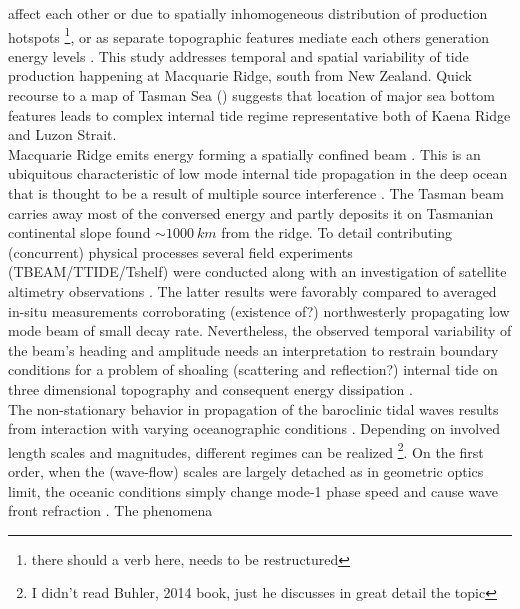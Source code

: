 \documentclass[12pt]{article}
\begin{document}
affect each other \citep{nash2004internal, zilberman2011incoherent, echeverri2010internal} or due 
to spatially inhomogeneous distribution of production hotspots \citep{osborne2011spatial, 
ponte2013coastal}\footnote{there should a verb here, needs to be restructured}, or as separate 
topographic features mediate each others generation energy levels \citep{xing1998three, 
buijsman2012modeling, buijsman2014three}. This study addresses temporal and spatial variability of 
tide production happening at Macquarie Ridge, south from New Zealand. Quick recourse to a map of 
Tasman Sea () suggests that location of major sea bottom features leads to 
complex internal tide regime representative both of Kaena Ridge and Luzon Strait.\\
Macquarie Ridge emits energy forming a spatially confined beam \citep{simmons2004internal, 
zhao2016global}. This is an ubiquitous characteristic of low mode internal tide propagation in the 
deep ocean that is thought to be a result of multiple source interference 
\citep{rainville2010interference}. The Tasman beam carries away most of the 
conversed energy and partly deposits it on Tasmanian continental slope found $\sim 1000~km$ from 
the ridge. To detail contributing (concurrent) physical processes several field experiments 
(TBEAM/TTIDE/Tshelf) were conducted \citep{pinkel2015breaking} along with an investigation of 
satellite altimetry observations \citep{zhao2018satellite}. The latter results were favorably 
compared to averaged in-situ measurements \citep{waterhouse2018observations} corroborating 
(existence of?) northwesterly propagating low mode beam of small decay rate. Nevertheless, the 
observed temporal variability of the beam's heading and amplitude needs an interpretation to 
restrain boundary conditions for a problem of shoaling (scattering and reflection?) internal tide 
on three dimensional topography and consequent energy dissipation \citep{klymak2016reflection}.\\
The non-stationary behavior in propagation of the baroclinic tidal waves results from interaction 
with varying oceanographic conditions \citep[e.g.,][]{mooers1975several}. Depending on involved 
length scales and magnitudes, different regimes can be realized \citep{buhler2014waves}\footnote{I 
didn't read Buhler, 2014 book, just he discusses 
in great detail the topic}. On the first order, when the (wave-flow) scales are largely detached as 
in  
geometric optics limit, the oceanic conditions simply change mode-1 phase speed and cause wave 
front refraction \citep{rainville2006propagation, zaron2014time, kelly2016internal}. The phenomena 
\end{document}
